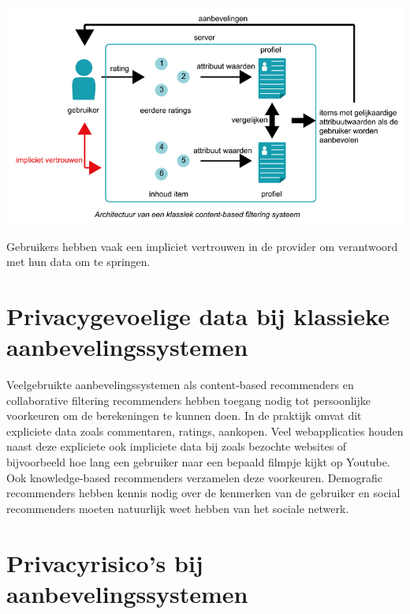 \begin{center}
\centering 
\includegraphics[scale=0.5]{fig/klassiek_systeem}    
	\label{Figuur::randomisatie}  
 
\end{center}

Gebruikers hebben vaak een impliciet vertrouwen in de provider om verantwoord met hun data om te springen. 
\pagebreak
\section{Privacygevoelige data bij klassieke aanbevelingssystemen}
Veelgebruikte aanbevelingssystemen als content-based recommenders en collaborative filtering recommenders hebben toegang nodig tot persoonlijke voorkeuren om de berekeningen te kunnen doen. In de praktijk omvat dit expliciete data zoals commentaren, ratings, aankopen. Veel webapplicaties houden naast deze expliciete ook impliciete data bij zoals bezochte websites of bijvoorbeeld hoe lang een gebruiker naar een bepaald filmpje kijkt op Youtube. Ook knowledge-based recommenders verzamelen deze voorkeuren. Demografic recommenders hebben kennis nodig over de kenmerken van de gebruiker en social recommenders moeten natuurlijk weet hebben van het sociale netwerk.
\section{Privacyrisico's bij aanbevelingssystemen}
\label{sec:risicos}
